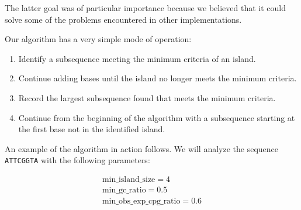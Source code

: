 \documentclass{bioinfo}
\newcommand{\dnaseq}[1]{\texttt{#1}}
\begin{document}
The latter goal was of particular importance because we believed that
it could solve some of the problems encountered in other
implementations.

Our algorithm has a very simple mode of operation:

\begin{enumerate}
\item Identify a subsequence meeting the minimum criteria of an island.
\item Continue adding bases until the island no longer meets the
  minimum criteria.
\item Record the largest subsequence found that meets the minimum criteria.
\item Continue from the beginning of the algorithm with a subsequence
  starting at the first base not in the identified island.
\end{enumerate}

An example of the algorithm in action follows. We will analyze the
sequence \dnaseq{ATTCGGTA} with the following parameters:

\begin{eqnarray*}
  \mbox{min\_island\_size} = 4 \\
  \mbox{min\_gc\_ratio} = 0.5 \\
  \mbox{min\_obs\_exp\_cpg\_ratio} = 0.6 \\
\end{eqnarray*}
\end{document}
